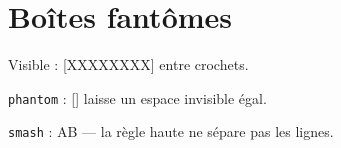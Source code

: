 \documentclass{article}
\begin{document}
\hsize=380pt
\section{Bo\^ites fant\^omes}
Visible : [XXXXXXXX] entre crochets.\par
\texttt{phantom} : [\phantom{XXXXXXXX}] laisse un espace invisible \'egal.\par
\texttt{smash} : A\smash{\rule{2pt}{40pt}}B --- la r\`egle haute ne s\'epare pas les lignes.
\end{document}
